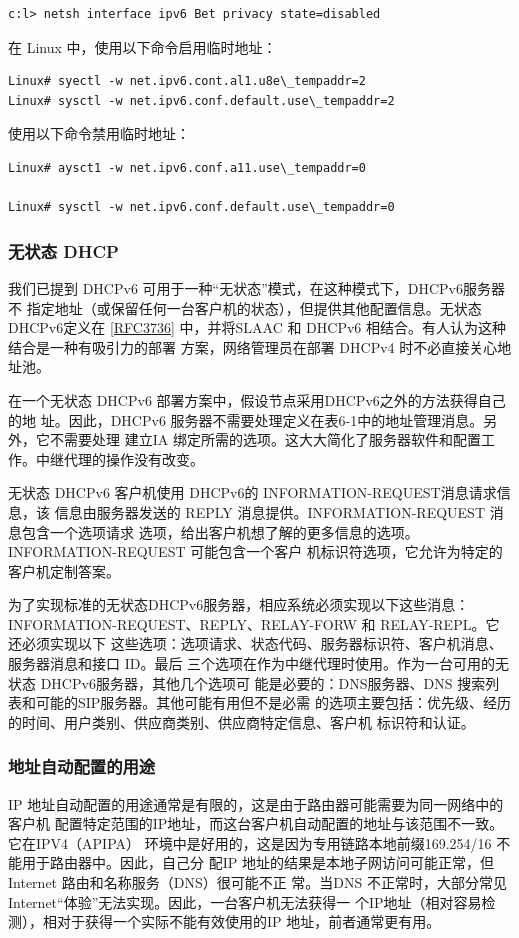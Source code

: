 \begin{verbatim}
c:l> netsh interface ipv6 Bet privacy state=disabled
\end{verbatim}

在 Linux 中，使用以下命令启用临时地址：
\begin{verbatim}
Linux# syectl -w net.ipv6.cont.al1.u8e\_tempaddr=2
Linux# sysctl -w net.ipv6.conf.default.use\_tempaddr=2
\end{verbatim}

使用以下命令禁用临时地址：
\begin{verbatim}
Linux# aysct1 -w net.ipv6.conf.a11.use\_tempaddr=0

Linux# sysctl -w net.ipv6.conf.default.use\_tempaddr=0
\end{verbatim}

\subsubsection{无状态 DHCP}
我们已提到 DHCPv6 可用于一种“无状态”模式，在这种模式下，DHCPv6服务器不
指定地址（或保留任何一台客户机的状态），但提供其他配置信息。无状态 DHCPv6定义在
\href{https://www.rfc-editor.org/rfc/rfc3736}{\href{https://www.rfc-editor.org/rfc/rfc3736}{[RFC3736]}}
中，并将SLAAC 和 DHCPv6 相结合。有人认为这种结合是一种有吸引力的部署
方案，网络管理员在部署 DHCPv4 时不必直接关心地址池。

在一个无状态 DHCPv6 部署方案中，假设节点采用DHCPv6之外的方法获得自己的地
址。因此，DHCPv6 服务器不需要处理定义在表6-1中的地址管理消息。另外，它不需要处理
建立IA 绑定所需的选项。这大大简化了服务器软件和配置工作。中继代理的操作没有改变。

无状态 DHCPv6 客户机使用 DHCPv6的 INFORMATION-REQUEST消息请求信息，该
信息由服务器发送的 REPLY 消息提供。INFORMATION-REQUEST 消息包含一个选项请求
选项，给出客户机想了解的更多信息的选项。INFORMATION-REQUEST 可能包含一个客户
机标识符选项，它允许为特定的客户机定制答案。

为了实现标准的无状态DHCPv6服务器，相应系统必须实现以下这些消息：
INFORMATION-REQUEST、REPLY、RELAY-FORW 和 RELAY-REPL。它还必须实现以下
这些选项：选项请求、状态代码、服务器标识符、客户机消息、服务器消息和接口 ID。最后
三个选项在作为中继代理时使用。作为一台可用的无状态 DHCPv6服务器，其他几个选项可
能是必要的：DNS服务器、DNS 搜索列表和可能的SIP服务器。其他可能有用但不是必需
的选项主要包括：优先级、经历的时间、用户类别、供应商类别、供应商特定信息、客户机
标识符和认证。

\subsubsection{地址自动配置的用途}
IP 地址自动配置的用途通常是有限的，这是由于路由器可能需要为同一网络中的客户机
配置特定范围的IP地址，而这台客户机自动配置的地址与该范围不一致。它在IPV4（APIPA）
环境中是好用的，这是因为专用链路本地前缀169.254/16 不能用于路由器中。因此，自己分
配IP 地址的结果是本地子网访问可能正常，但 Internet 路由和名称服务（DNS）很可能不正
常。当DNS 不正常时，大部分常见 Internet“体验”无法实现。因此，一台客户机无法获得一
个IP地址（相对容易检测），相对于获得一个实际不能有效使用的IP 地址，前者通常更有用。


